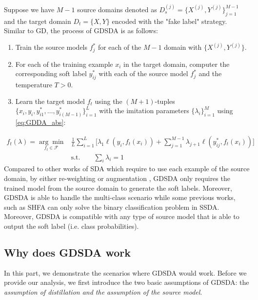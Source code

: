 Suppose we have $M-1$ source domains denoted as $D_s^{(j)}=\{X^{(j)},Y^{(j)}\}_{j=1}^{M-1}$ and the target domain $D_t=\{X,Y\}$ encoded with the "fake label" strategy. Similar to GD, the process of GDSDA is as follows:
\begin{enumerate}
    \item Train the source models $f^*_j$ for each of the $M-1$ domain with $\{X^{(j)},Y^{(j)}\}$.
    \item For each of the training example $x_i$ in the target domain, computer the corresponding soft label $y^*_{ij}$ with each of the source model $f^*_j$ and the temperature $T>0$.
    \item Learn the target model $f_t$ using the $(M+1)$-tuples $\{x_i,y_i,y^*_{i1},\dots,y^*_{i(M-1)}\}_{i=1}^L$ with the imitation parameters $\{\lambda_i\}^M_{i=1}$ using \eqref{eq:GDDA_abs}:
\end{enumerate} 
\begin{equation}\label{eq:GDDA_abs}
\begin{aligned}
f_t(\lambda)=\underset{f_t \in \mathcal{F}}{\arg \min}&\frac{1}{L}\sum_{i=1}^{L}\bigg[\lambda_1\ell\left(y_i,f_t(x_i)\right)+\sum_{j=1}^{M-1}\lambda_{j+1}\ell\left(y^*_{ij},f_t(x_i)\right)\bigg]\qquad\\
 &\text{s.t.} \qquad \sum_i\lambda_i=1
\end{aligned}
\end{equation}
Compared to other works of SDA which require to use each example of the source domain, by either re-weighting \cite{Donahue_2013_CVPR,duan2012visual} or augmentation \cite{daume2010frustratingly}, GDSDA only requires the trained model from the source domain to generate the soft labels. 
Moreover, GDSDA is able to handle the multi-class scenario while some previous works, such as SHFA\cite{duan2012learning} can only solve the binary classification problem in SSDA. Moreover, GDSDA is compatible with any type of source model that is able to output the soft label (i.e. class probabilities).

\subsection{Why does GDSDA work}
In this part, we demonstrate the scenarios where GDSDA would work. Before we provide our analysis, we first introduce the two basic assumptions of GDSDA: the \textit{assumption of distillation and the assumption of the source model}.

